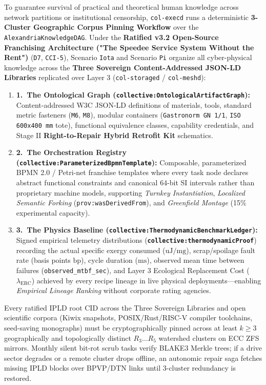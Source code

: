 To guarantee survival of practical and theoretical human knowledge across network partitions or
institutional censorship, \texttt{col-execd} runs a deterministic \textbf{3-Cluster Geographic Corpus
Pinning Workflow} over the \texttt{AlexandriaKnowledgeDAG}. Under the \textbf{Ratified v3.2 Open-Source
Franchising Architecture ("The Speedee Service System Without the Rent")} (\texttt{D7}, \texttt{CCI-5}),
Scenario \texttt{Iota} and Scenario \texttt{Pi} organize all cyber-physical knowledge across the
\textbf{Three Sovereign Content-Addressed JSON-LD Libraries} replicated over Layer 3 (\texttt{col-storaged}
/ \texttt{col-meshd}):
\begin{enumerate}
    \item \textbf{1.\ The Ontological Graph (\texttt{collective:OntologicalArtifactGraph}):} Content-addressed
    W3C JSON-LD definitions of materials, tools, standard metric fasteners (\texttt{M6}, \texttt{M8}),
    modular containers (\texttt{Gastronorm GN 1/1}, \texttt{ISO 600x400 mm} tote), functional equivalence
    classes, capability credentials, and Stage II \textbf{Right-to-Repair Hybrid Retrofit Kit} schematics.
    \item \textbf{2.\ The Orchestration Registry (\texttt{collective:ParameterizedBpmnTemplate}):}
    Composable, parameterized BPMN 2.0 / Petri-net franchise templates where every task node declares
    abstract functional constraints and canonical 64-bit SI intervals rather than proprietary machine models,
    supporting \textit{Turnkey Instantiation}, \textit{Localized Semantic Forking} (\texttt{prov:wasDerivedFrom}),
    and \textit{Greenfield Montage} (15\% experimental capacity).
    \item \textbf{3.\ The Physics Baseline (\texttt{collective:ThermodynamicBenchmarkLedger}):} Signed
    empirical telemetry distributions (\textbf{\texttt{collective:thermodynamicProof}}) recording the actual
    specific exergy consumed ($\mathrm{uJ / mg}$), scrap/spoilage fault rate (basis points $\mathrm{bp}$),
    cycle duration ($\mathrm{ms}$), observed mean time between failures (\texttt{observed\_mtbf\_sec}), and
    Layer 3 Ecological Replacement Cost ($\lambda_{\mathrm{ERC}}$) achieved by every recipe lineage in
    live physical deployments---enabling \textit{Empirical Lineage Ranking} without corporate rating agencies.
\end{enumerate}
Every ratified IPLD root CID across the Three Sovereign Libraries and open scientific corpora (Kiwix
snapshots, POSIX/Rust/RISC-V compiler toolchains, seed-saving monographs) must be cryptographically pinned
across at least $k \ge 3$ geographically and topologically distinct $R_3 \dots R_5$ watershed clusters
\parencite{fall2003,shapiro2011crdt} on ECC ZFS mirrors. Monthly silent bit-rot scrub tasks verify BLAKE3
Merkle trees; if a drive sector degrades or a remote cluster drops offline, an autonomic repair saga
fetches missing IPLD blocks over BPVP/DTN links until $3\text{-cluster}$ redundancy is restored.

